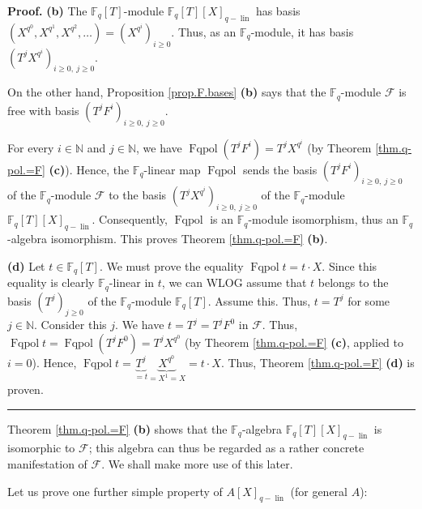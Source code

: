 \documentclass[numbers=enddot,12pt,final,onecolumn,notitlepage]{scrartcl}%
\theoremstyle{definition}
\newenvironment{proof}[1][Proof]{\noindent\textbf{#1.} }{\ \rule{0.5em}{0.5em}}
\begin{document}
\begin{proof}
\textbf{(b)} The $\mathbb{F}_{q}\left[  T\right]  $-module $\mathbb{F}%
_{q}\left[  T\right]  \left[  X\right]  _{q-\operatorname*{lin}}$ has basis
$\left(  X^{q^{0}},X^{q^{1}},X^{q^{2}},\ldots\right)  =\left(  X^{q^{i}%
}\right)  _{i\geq0}$. Thus, as an $\mathbb{F}_{q}$-module, it has basis
$\left(  T^{j}X^{q^{i}}\right)  _{i\geq0,\ j\geq0}$.

On the other hand, Proposition \ref{prop.F.bases} \textbf{(b)} says that the
$\mathbb{F}_{q}$-module $\mathcal{F}$ is free with basis $\left(  T^{j}%
F^{i}\right)  _{i\geq0,\ j\geq0}$.

For every $i\in\mathbb{N}$ and $j\in\mathbb{N}$, we have
$\operatorname*{Fqpol}\left(  T^{j}F^{i}\right)  =T^{j}X^{q^{i}}$ (by Theorem
\ref{thm.q-pol.=F} \textbf{(c)}). Hence, the $\mathbb{F}_{q}$-linear map
$\operatorname*{Fqpol}$ sends the basis $\left(  T^{j}F^{i}\right)
_{i\geq0,\ j\geq0}$ of the $\mathbb{F}_{q}$-module $\mathcal{F}$ to the basis
$\left(  T^{j}X^{q^{i}}\right)  _{i\geq0,\ j\geq0}$ of the $\mathbb{F}_{q}%
$-module $\mathbb{F}_{q}\left[  T\right]  \left[  X\right]
_{q-\operatorname*{lin}}$. Consequently, $\operatorname*{Fqpol}$ is an
$\mathbb{F}_{q}$-module isomorphism, thus an $\mathbb{F}_{q}$-algebra
isomorphism. This proves Theorem \ref{thm.q-pol.=F} \textbf{(b)}. \medskip

\textbf{(d)} Let $t\in\mathbb{F}_{q}\left[  T\right]  $. We must prove the
equality $\operatorname*{Fqpol}t=t\cdot X$. Since this equality is clearly
$\mathbb{F}_{q}$-linear in $t$, we can WLOG assume that $t$ belongs to the
basis $\left(  T^{j}\right)  _{j\geq0}$ of the $\mathbb{F}_{q}$-module
$\mathbb{F}_{q}\left[  T\right]  $. Assume this. Thus, $t=T^{j}$ for some
$j\in\mathbb{N}$. Consider this $j$. We have $t=T^{j}=T^{j}F^{0}$ in
$\mathcal{F}$. Thus, $\operatorname*{Fqpol}t=\operatorname*{Fqpol}\left(
T^{j}F^{0}\right)  =T^{j}X^{q^{0}}$ (by Theorem \ref{thm.q-pol.=F}
\textbf{(c)}, applied to $i=0$). Hence, $\operatorname*{Fqpol}%
t=\underbrace{T^{j}}_{=t}\underbrace{X^{q^{0}}}_{=X^{1}=X}=t\cdot X$. Thus,
Theorem \ref{thm.q-pol.=F} \textbf{(d)} is proven.
\end{proof}

Theorem \ref{thm.q-pol.=F} \textbf{(b)} shows that the $\mathbb{F}_{q}%
$-algebra $\mathbb{F}_{q}\left[  T\right]  \left[  X\right]
_{q-\operatorname*{lin}}$ is isomorphic to $\mathcal{F}$; this algebra can
thus be regarded as a rather concrete manifestation of $\mathcal{F}$. We shall
make more use of this later.

Let us prove one further simple property of $A\left[  X\right]
_{q-\operatorname*{lin}}$ (for general $A$):
\end{document}
